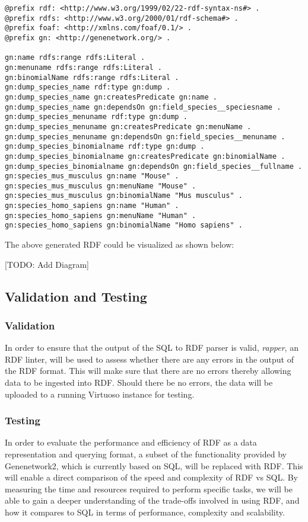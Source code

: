 \begin{verbatim}
@prefix rdf: <http://www.w3.org/1999/02/22-rdf-syntax-ns#> .
@prefix rdfs: <http://www.w3.org/2000/01/rdf-schema#> .
@prefix foaf: <http://xmlns.com/foaf/0.1/> .
@prefix gn: <http://genenetwork.org/> .

gn:name rdfs:range rdfs:Literal .
gn:menuname rdfs:range rdfs:Literal .
gn:binomialName rdfs:range rdfs:Literal .
gn:dump_species_name rdf:type gn:dump .
gn:dump_species_name gn:createsPredicate gn:name .
gn:dump_species_name gn:dependsOn gn:field_species__speciesname .
gn:dump_species_menuname rdf:type gn:dump .
gn:dump_species_menuname gn:createsPredicate gn:menuName .
gn:dump_species_menuname gn:dependsOn gn:field_species__menuname .
gn:dump_species_binomialname rdf:type gn:dump .
gn:dump_species_binomialname gn:createsPredicate gn:binomialName .
gn:dump_species_binomialname gn:dependsOn gn:field_species__fullname .
gn:species_mus_musculus gn:name "Mouse" .
gn:species_mus_musculus gn:menuName "Mouse" .
gn:species_mus_musculus gn:binomialName "Mus musculus" .
gn:species_homo_sapiens gn:name "Human" .
gn:species_homo_sapiens gn:menuName "Human" .
gn:species_homo_sapiens gn:binomialName "Homo sapiens" .
\end{verbatim}

The above generated RDF could be visualized as shown below:

[TODO: Add Diagram]


\subsection{Validation and Testing}
\subsubsection*{Validation}
In order to ensure that the output of the SQL to RDF parser is valid, \textit{rapper}, an RDF linter, will be used to assess whether there are any errors in the output of the RDF format.  This will make sure that there are no errors thereby allowing data to be ingested into RDF.  Should there be no errors, the data will be uploaded to a running Virtuoso instance for testing.

\subsubsection*{Testing}

In order to evaluate the performance and efficiency of RDF as a data representation and querying format, a subset of the functionality provided by Genenetwork2, which is currently based on SQL, will be replaced with RDF.  This will enable a direct comparison of the speed and complexity of RDF vs SQL.  By measuring the time and resources required to perform specific tasks, we will be able to gain a deeper understanding of the trade-offs involved in using RDF, and how it compares to SQL in terms of performance, complexity and scalability.


